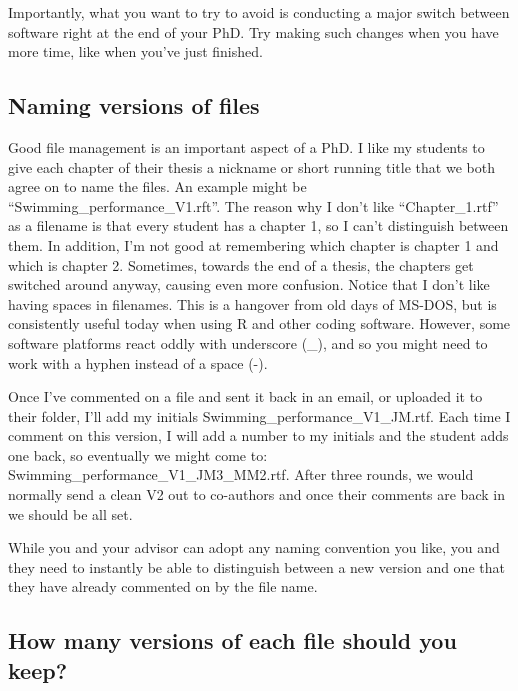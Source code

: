 \documentclass[
]{krantz}
\begin{document}
Importantly, what you want to try to avoid is conducting a major switch between software right at the end of your PhD. Try making such changes when you have more time, like when you've just finished.

\hypertarget{naming-versions-of-files}{%
\subsection{Naming versions of files}\label{naming-versions-of-files}}

Good file management is an important aspect of a PhD. I like my students to give each chapter of their thesis a nickname or short running title that we both agree on to name the files. An example might be ``Swimming\_performance\_V1.rft''. The reason why I don't like ``Chapter\_1.rtf'' as a filename is that every student has a chapter 1, so I can't distinguish between them. In addition, I'm not good at remembering which chapter is chapter 1 and which is chapter 2. Sometimes, towards the end of a thesis, the chapters get switched around anyway, causing even more confusion. Notice that I don't like having spaces in filenames. This is a hangover from old days of MS-DOS, but is consistently useful today when using R and other coding software. However, some software platforms react oddly with underscore (\_), and so you might need to work with a hyphen instead of a space (-).

Once I've commented on a file and sent it back in an email, or uploaded it to their folder, I'll add my initials Swimming\_performance\_V1\_JM.rtf. Each time I comment on this version, I will add a number to my initials and the student adds one back, so eventually we might come to: Swimming\_performance\_V1\_JM3\_MM2.rtf. After three rounds, we would normally send a clean V2 out to co-authors and once their comments are back in we should be all set.

While you and your advisor can adopt any naming convention you like, you and they need to instantly be able to distinguish between a new version and one that they have already commented on by the file name.

\hypertarget{how-many-versions-of-each-file-should-you-keep}{%
\subsection{How many versions of each file should you keep?}\label{how-many-versions-of-each-file-should-you-keep}}
\end{document}
